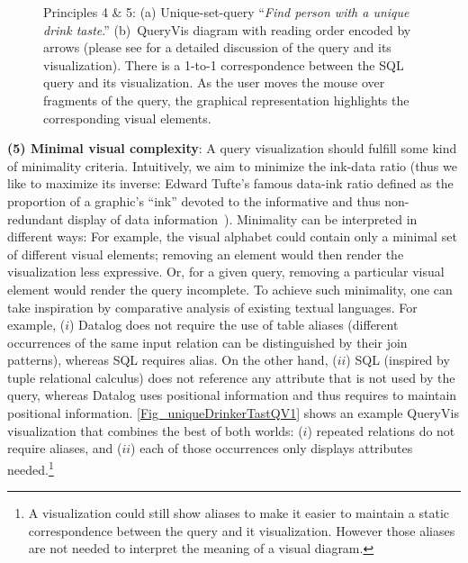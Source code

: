 \documentclass[letterpaper,11pt]{article}
\newcommand{\queryvis}{\textsf{QueryVis}\xspace}
\begin{document}
\begin{figure}[t]
{	\label{Fig_uniqueDrinkerTastQV1}}	
%
%
%
%
\caption{Principles 4 \& 5: 
(a) Unique-set-query ``\emph{Find person with a unique drink taste}.''
(b)~\queryvis diagram with reading order encoded by arrows 
(please see \cite{DBLP:conf/sigmod/LeventidisZDGJR20} for a detailed discussion of the query and its visualization).
There is a 1-to-1 correspondence between the SQL query and its visualization. 
As the user moves the mouse over fragments of the query, the graphical representation highlights the corresponding visual elements.
%
%
%
%
%
}
\label{fig:beerquery}
\end{figure}









\textbf{(5) Minimal visual complexity}: 
A query visualization should fulfill some kind of minimality criteria.
Intuitively, we aim to minimize the ink-data ratio 
(thus we like to maximize its inverse: Edward Tufte's famous data-ink ratio defined as the proportion of a graphic’s “ink” devoted to the informative and thus non-redundant display of data information~\cite{tufte2001visual}).
Minimality can be interpreted in different ways:
For example, the visual alphabet could contain only a minimal set of different visual elements; removing an element would then render the visualization less expressive.
Or, for a given query, removing a particular visual element would render the query incomplete.
To achieve such minimality, one can take inspiration by comparative analysis of existing textual languages.
For example, 
($i$) Datalog does not require the use of table aliases (different occurrences of the same input relation can be distinguished by their join patterns), whereas SQL requires alias.
On the other hand, ($ii$) SQL (inspired by tuple relational calculus) does not reference any attribute that is not used by the query,
whereas Datalog uses positional information and thus requires to maintain positional information.
\autoref{Fig_uniqueDrinkerTastQV1}
shows an example \queryvis visualization that combines the best of both worlds: 
($i$) repeated relations do not require aliases, 
and ($ii$) each of those occurrences only displays attributes needed.\footnote{A visualization could still show aliases to make it easier to maintain a static correspondence between the query and it visualization. However those aliases are not needed to interpret the meaning of a visual diagram.}

\end{document}
